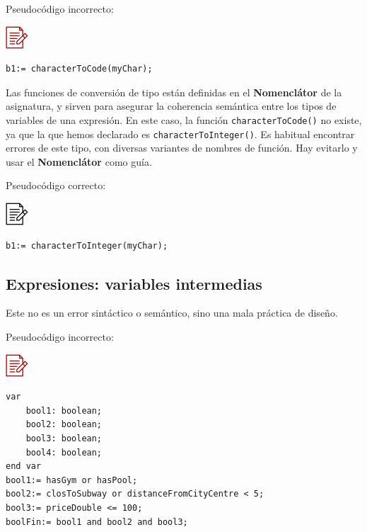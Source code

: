 \documentclass[
]{book}
\begin{document}
Pseudocódigo incorrecto:

\includegraphics{./img/alg_err.png}

\begin{verbatim}
b1:= characterToCode(myChar);
\end{verbatim}

Las funciones de conversión de tipo están definidas en el \textbf{Nomenclátor} de la asignatura, y sirven para asegurar la coherencia semántica entre los tipos de variables de una expresión. En este caso, la función \texttt{characterToCode()} no existe, ya que la que hemos declarado es \texttt{characterToInteger()}. Es habitual encontrar errores de este tipo, con diversas variantes de nombres de función. Hay evitarlo y usar el \textbf{Nomenclátor} como guía.

Pseudocódigo correcto:

\includegraphics{./img/alg.png}

\begin{verbatim}
b1:= characterToInteger(myChar);
\end{verbatim}

\hypertarget{expresiones-variables-intermedias}{%
\subsection{Expresiones: variables intermedias}\label{expresiones-variables-intermedias}}

Este no es un error sintáctico o semántico, sino una mala práctica de diseño.

Pseudocódigo incorrecto:

\includegraphics{./img/alg_err.png}

\begin{verbatim}
var
    bool1: boolean;
    bool2: boolean;
    bool3: boolean;
    bool4: boolean;
end var
bool1:= hasGym or hasPool;
bool2:= closToSubway or distanceFromCityCentre < 5;
bool3:= priceDouble <= 100;
boolFin:= bool1 and bool2 and bool3;
\end{verbatim}
\end{document}
